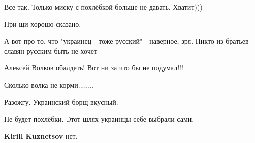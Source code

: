 \begin{itemize}
Все так. Только миску с похлёбкой больше не давать. Хватит)))

 
При щи хорошо сказано.

А вот про то, что "украинец - тоже русский" - наверное, зря. Никто из
братьев-славян русским быть не хочет

\begin{itemize}
 
Алексей Волков обалдеть! Вот ни за что бы не подумал!!!
\end{itemize}

 
Сколько волка не корми........

 
Разожгу. Украинский борщ вкусный.

 
Не будет похлёбки. Этот шлях украинцы себе выбрали сами.

\begin{itemize}
 
\textbf{Kirill Kuznetsov} нет.

 

\end{itemize}
\end{itemize}
